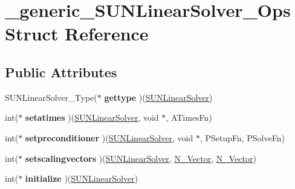 \hypertarget{struct__generic__SUNLinearSolver__Ops}{}\section{\+\_\+generic\+\_\+\+S\+U\+N\+Linear\+Solver\+\_\+\+Ops Struct Reference}
\label{struct__generic__SUNLinearSolver__Ops}
\subsection*{Public Attributes}
\begin{DoxyCompactItemize}
\item 
\mbox{\label{struct__generic__SUNLinearSolver__Ops_a9a3a4a40305fc1c011959cf57a4f4372}} 
S\+U\+N\+Linear\+Solver\+\_\+\+Type($\ast$ {\bfseries gettype} )(\mbox{\hyperlink{struct__generic__SUNLinearSolver}{S\+U\+N\+Linear\+Solver}})
\item 
\mbox{\label{struct__generic__SUNLinearSolver__Ops_a3478e45527ec432956f4c983b3ea294d}} 
int($\ast$ {\bfseries setatimes} )(\mbox{\hyperlink{struct__generic__SUNLinearSolver}{S\+U\+N\+Linear\+Solver}}, void $\ast$, A\+Times\+Fn)
\item 
\mbox{\label{struct__generic__SUNLinearSolver__Ops_ae8a77ae798ecfce19056b5520d195338}} 
int($\ast$ {\bfseries setpreconditioner} )(\mbox{\hyperlink{struct__generic__SUNLinearSolver}{S\+U\+N\+Linear\+Solver}}, void $\ast$, P\+Setup\+Fn, P\+Solve\+Fn)
\item 
\mbox{\label{struct__generic__SUNLinearSolver__Ops_a1f5bf8656f32d0383bf9f26906fa10ed}} 
int($\ast$ {\bfseries setscalingvectors} )(\mbox{\hyperlink{struct__generic__SUNLinearSolver}{S\+U\+N\+Linear\+Solver}}, \mbox{\hyperlink{struct__generic__N__Vector}{N\+\_\+\+Vector}}, \mbox{\hyperlink{struct__generic__N__Vector}{N\+\_\+\+Vector}})
\item 
\mbox{\label{struct__generic__SUNLinearSolver__Ops_a0685ad3d94df329fd2961538a593ebb5}} 
int($\ast$ {\bfseries initialize} )(\mbox{\hyperlink{struct__generic__SUNLinearSolver}{S\+U\+N\+Linear\+Solver}})

\end{DoxyCompactItemize}
